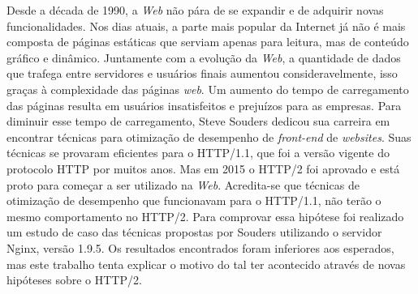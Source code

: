 %
%

\begin{resumo}

Desde a década de 1990, a \textit{Web} não pára de se expandir e de adquirir novas funcionalidades. Nos dias atuais, a parte mais popular da Internet já não é mais composta de páginas estáticas que serviam apenas para leitura, mas de conteúdo gráfico e dinâmico. Juntamente com a evolução da \textit{Web}, a quantidade de dados que trafega entre servidores e usuários finais aumentou consideravelmente, isso graças à complexidade das páginas \textit{web}. Um aumento do tempo de carregamento das páginas resulta em usuários insatisfeitos e prejuízos para as empresas. Para diminuir esse tempo de carregamento, Steve Souders dedicou sua carreira em encontrar técnicas para otimização de desempenho de \textit{front-end} de \textit{websites}. Suas técnicas se provaram eficientes para o HTTP/1.1, que foi a versão vigente do protocolo HTTP por muitos anos. Mas em 2015 o HTTP/2 foi aprovado e está proto para começar a ser utilizado na \textit{Web}. Acredita-se que técnicas de otimização de desempenho que funcionavam para o HTTP/1.1, não terão o mesmo comportamento no HTTP/2. Para comprovar essa hipótese foi realizado um estudo de caso das técnicas propostas por Souders utilizando o servidor Nginx, versão 1.9.5. Os resultados encontrados foram inferiores aos esperados, mas este trabalho tenta explicar o motivo do tal ter acontecido através de novas hipóteses sobre o HTTP/2.

\end{resumo}